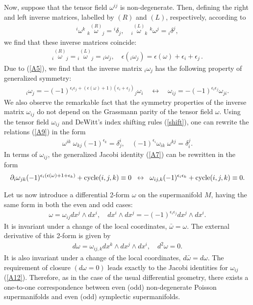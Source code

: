 \documentclass[a4paper,11pt]{article}
\begin{document}
\begin{appendix}
Now, suppose that the tensor field $\omega^{ij}$ is non-degenerate.
Then, defining the right and left inverse matrices, labelled by $(R)$
and $(L)$, respectively, according to
\begin{eqnarray}
\label{A9}
{^i\omega^k}\;{_k\overset{(R)}{\omega}_j}={^i\delta_j},\quad
{_i\overset{(L)}{\omega}_k}\;{^k\omega^j}={_i\delta^j},
\end{eqnarray}
we find that these inverse matrices coincide:
\begin{eqnarray}
\label{A10}
{_i\overset{(R)}{\omega}_j}={_i\overset{(L)}{\omega}_j}={_i\omega_j},\quad
\epsilon({_i\omega_j})= \epsilon(\omega)+\epsilon_i+\epsilon_j\,.
\end{eqnarray}
Due to (\ref{A5}), we find that the inverse matrix ${_i\omega_j}$ has
the following property of generalized symmetry:
\begin{eqnarray}
\label{A11} {_i\omega_j}=
-(-1)^{\epsilon_i\epsilon_j+(\epsilon(\omega)
+1)(\epsilon_i+\epsilon_j)} {_j\omega_i}\quad\leftrightarrow\quad
\omega_{ij}=-(-1)^{\epsilon_i\epsilon_j}\omega_{ji}.
\end{eqnarray}
We also observe the remarkable fact that the symmetry properties
of the inverse matrix $\omega_{ij}$ do not depend on the Grassmann
parity of the tensor field $\omega$. Using the tensor field
$\omega_{ij}$ and DeWitt's index shifting rules (\ref{shift}), one
can rewrite the relations (\ref{A9}) in the form
\begin{eqnarray}
\label{A}
\omega^{ik}\;\omega_{kj}(-1)^{\epsilon_k}=\delta^i_j,\quad
(-1)^{\epsilon_i}\omega_{ik}\;\omega^{kj}=\delta^j_i.
\end{eqnarray}
In terms of $\omega_{ij}$, the generalized Jacobi identity
(\ref{A7}) can be rewritten in the form
\begin{eqnarray}
\label{A12}
\partial_i\omega_{jk}(-1)^{\epsilon_i(\epsilon(\omega)+1+\epsilon_k)}
+ {\rm cycle} (i,j,k)\equiv 0 \;\;\leftrightarrow\;\;
\omega_{ij,k}(-1)^{\epsilon_i\epsilon_k}+ {\rm cycle} (i,j,k)
\equiv 0.
\end{eqnarray}

Let us now introduce a differential 2-form $\omega$ on the
supermanifold $M$, having the same form in both the even and
odd cases:
\begin{eqnarray}
\label{A13} \omega = \omega_{ij}dx^j\wedge dx^i, \quad dx^i\wedge
dx^j = -(-1)^{\epsilon_i\epsilon_j}dx^j\wedge dx^i.
\end{eqnarray}
It is invariant under a change of the local coordinates,
${\bar\omega}=\omega$. The external derivative of this 2-form is
given by
\begin{eqnarray}
\label{A14} d\omega = \omega_{ij,k}dx^k\wedge dx^j\wedge dx^i,
\quad d^2\omega=0.
\end{eqnarray}
It is also invariant under a change of the local coordinates,
$d{\bar \omega} = d\omega$. The requirement of closure
$(d\omega=0)$ leads exactly to the Jacobi identities for
$\omega_{ij}$ (\ref{A12}). Therefore, as in the case of the usual
differential geometry, there exists a one-to-one correspondence
between even (odd) non-degenerate Poisson supermanifolds and even
(odd) symplectic supermanifolds.


\end{appendix}
\end{document}
